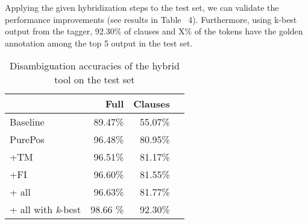 Applying the given hybridization steps to the test set, we can validate the performance improvements (see results in Table~\cite{tab:test} 4).
Furthermore, using k-best output from the tagger, 92.30\% of clauses and X\% of the tokens have the golden annotation among the top 5 output in the test set.

\begin{table}[ht]
\centering
\caption{Disambiguation accuracies of the hybrid tool on the test set}
\label{tab:test}

\begin{tabular}{l r r r}
\hline
 & Full & Clauses  \\
\hline
Baseline  & 89.47\% & 55.07\% \\
PurePos  & 96.48\% & 80.95\% \\
+TM  & 96.51\% & 81.17\% \\
+FI  & 96.60\% & 81.55\% \\
+ all  & 96.63\% & 81.77\% \\
+ all with \emph{k}-best  & 98.66 \% & 92.30\% \\
\hline
\end{tabular}
\end{table}
 
